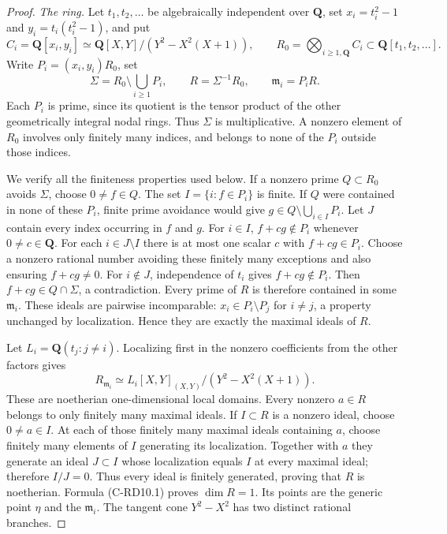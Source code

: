 \begin{proof}
\emph{The ring.} Let $t_1,t_2,\ldots$ be algebraically independent over
$\mathbf Q$, set $x_i=t_i^2-1$ and $y_i=t_i(t_i^2-1)$, and put
\[
 C_i=\mathbf Q[x_i,y_i]
   \simeq\mathbf Q[X,Y]/(Y^2-X^2(X+1)),\qquad
 R_0=\bigotimes_{i\geq1,\mathbf Q} C_i\subset\mathbf Q[t_1,t_2,\ldots].
\]
Write $P_i=(x_i,y_i)R_0$, set
\[
 \Sigma=R_0\setminus\bigcup_{i\geq1}P_i,
 \qquad R=\Sigma^{-1}R_0,
 \qquad \mathfrak m_i=P_iR.
\]
Each $P_i$ is prime, since its quotient is the tensor product of the
other geometrically integral nodal rings. Thus $\Sigma$ is
multiplicative. A nonzero element of $R_0$ involves only finitely many
indices, and belongs to none of the $P_i$ outside those indices.

We verify all the finiteness properties used below. If a nonzero prime
$Q\subset R_0$ avoids $\Sigma$, choose $0\ne f\in Q$. The set
$I=\{i:f\in P_i\}$ is finite. If $Q$ were contained in none of these
$P_i$, finite prime avoidance would give
$g\in Q\setminus\bigcup_{i\in I}P_i$. Let $J$ contain every index
occurring in $f$ and $g$. For $i\in I$, $f+cg\notin P_i$ whenever
$0\ne c\in\mathbf Q$. For each $i\in J\setminus I$ there is at most
one scalar $c$ with $f+cg\in P_i$. Choose a nonzero rational number
avoiding these finitely many exceptions and also ensuring $f+cg\ne0$.
For $i\notin J$, independence of $t_i$ gives $f+cg\notin P_i$.
Then $f+cg\in Q\cap\Sigma$, a contradiction. Every prime of $R$
is therefore contained in some $\mathfrak m_i$. These ideals are
pairwise incomparable: $x_i\in P_i\setminus P_j$ for $i\ne j$, a
property unchanged by localization. Hence they are exactly the
maximal ideals of $R$.

Let $L_i=\mathbf Q(t_j:j\ne i)$. Localizing first in the nonzero
coefficients from the other factors gives
\[
 R_{\mathfrak m_i}
   \simeq L_i[X,Y]_{(X,Y)}/(Y^2-X^2(X+1)).                 \tag{C-RD10.1}
\]
These are noetherian one-dimensional local domains. Every nonzero
$a\in R$ belongs to only finitely many maximal ideals. If $I\subset R$
is a nonzero ideal, choose $0\ne a\in I$. At each of those finitely
many maximal ideals containing $a$, choose finitely many elements of
$I$ generating its localization. Together with $a$ they generate an
ideal $J\subset I$ whose localization equals $I$ at every maximal
ideal; therefore $I/J=0$. Thus every ideal is finitely generated,
proving that $R$ is noetherian. Formula (C-RD10.1) proves $\dim R=1$.
Its points are the generic point $\eta$ and the $\mathfrak m_i$.
The tangent cone $Y^2-X^2$ has two distinct rational branches.


\end{proof}
